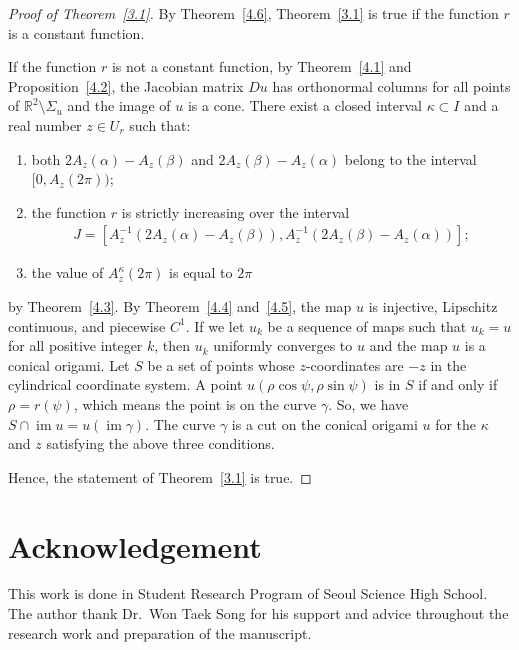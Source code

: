 \documentclass{amsart}
\theoremstyle{plain}
\theoremstyle{definition}
\theoremstyle{remark}
\DeclareMathOperator{\im}{im}
\begin{document}
\begin{proof}[Proof of Theorem~\ref{3.1}]%
By Theorem~\ref{4.6}, Theorem~\ref{3.1} is true if the function $r$ is a constant function.

If the function $r$ is not a constant function,
by Theorem~\ref{4.1} and Proposition~\ref{4.2}, the Jacobian matrix $Du$ has orthonormal columns for all points of $\mathbb{R}^2\setminus\Sigma_u$ and the image of $u$ is a cone.
There exist a closed interval $\kappa\subset I$ and a real number $z\in U_r$ such that:
\begin{enumerate}
\item both $2A_z(\alpha)-A_z(\beta)$ and $2A_z(\beta)-A_z(\alpha)$ belong to the interval $[0,A_z(2\pi))$;
\item the function $r$ is strictly increasing over the interval
\begin{align*}
J=[A_z^{-1}(2A_z(\alpha)-A_z(\beta)),A_z^{-1}(2A_z(\beta)-A_z(\alpha))];
\end{align*}
\item the value of $A_z^{\kappa}(2\pi)$ is equal to $2\pi$
\end{enumerate}
by Theorem~\ref{4.3}.
By Theorem~\ref{4.4} and~\ref{4.5}, the map $u$ is injective, Lipschitz continuous, and piecewise $C^1$.
If we let $u_k$ be a sequence of maps such that $u_k=u$ for all positive integer $k$, then $u_k$ uniformly converges to $u$ and the map $u$ is a conical origami.
Let $S$ be a set of points whose $z$-coordinates are $-z$ in the cylindrical coordinate system. %
A point $u(\rho\cos\psi,\rho\sin\psi)$ is in $S$ if and only if $\rho=r(\psi)$, which means the point is on the curve $\gamma$.
So, we have $S\cap\im u=u(\im\gamma)$.
The curve $\gamma$ is a cut on the conical origami $u$ for the $\kappa$ and $z$ satisfying the above three conditions.

Hence, the statement of Theorem~\ref{3.1} is true.
\end{proof}

\section*{Acknowledgement}
This work is done in Student Research Program of Seoul Science High School. 
The author thank Dr.~Won Taek Song for his support and advice 
throughout the research work and preparation of the manuscript. 




\end{document}
